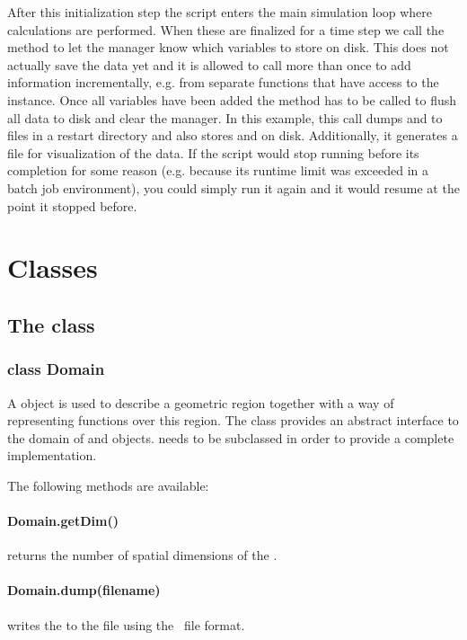 After this initialization step the script enters the main simulation loop
where calculations are performed.
When these are finalized for a time step we call the  method
to let the manager know which variables to store on disk.
This does not actually save the data yet and it is allowed to call
 more than once to add information incrementally, e.g. from
separate functions that have access to the  instance.
Once all variables have been added the  method has to be called
to flush all data to disk and clear the manager.
In this example, this call dumps  and  to files
in a restart directory and also stores  and  on disk.
Additionally, it generates a \VTK file for visualization of the data.
If the script would stop running before its completion for some reason (e.g.
because its runtime limit was exceeded in a batch job environment), you could
simply run it again and it would resume at the point it stopped before.

\section{\escript Classes}

\subsection{The \Domain class}
\subsubsection*{class Domain}
A \Domain object is used to describe a geometric region together with
a way of representing functions over this region.
The \Domain class provides an abstract interface to the domain of \FunctionSpace and \Data objects.
\Domain needs to be subclassed in order to provide a complete implementation.


\vspace{1em}\noindent The following methods are available:
\paragraph{Domain.getDim()}
returns the number of spatial dimensions of the \Domain.

%
\paragraph{Domain.dump(filename)}
writes the \Domain to the file  using the \HDF\ file format.

